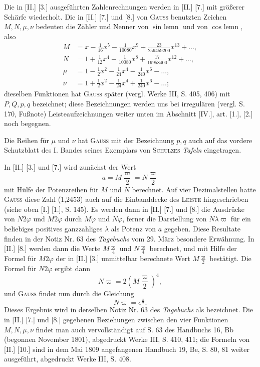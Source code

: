 Die in [II.] [3.] ausgeführten Zahlenrechnungen werden in [II.] [7.] mit größerer Schärfe wiederholt. Die in [II.] [7.] und [8.] von \textsc{Gauss} benutzten Zeichen \(M,N,\mu,\nu\) bedeuten die Zähler und Nenner von \(\sin\text{ lemn}\) und von \(\cos\text{ lemn}\), also
\[\begin{aligned}
M&=x-\frac1{16}x^5-\frac1{10080}x^9+\frac{23}{259459200}x^{13}+\ldots,\\
N&=1+\frac1{12}x^4-\frac1{10080}x^8+\frac{17}{19958400}x^{12}+\ldots,\\
\mu&=1-\frac12x^2-\frac1{24}x^4-\frac1{240}x^6-\ldots,\\
\nu&=1+\frac12x^2-\frac1{24}x^4+\frac1{240}x^6-\ldots;
\end{aligned}\]
dieselben Funktionen hat \textsc{Gauss} später (vergl. Werke III, S. 405, 406) mit \(P,Q,p,q\) bezeichnet; diese Bezeichnungen werden uns bei irregulären (vergl. S. 170, Fußnote) Leisteaufzeichnungen weiter unten im Abschnitt [IV.], art. [1.], [2.] noch begegnen.

Die Reihen für \(\mu\) und \(\nu\) hat \textsc{Gauss} mit der Bezeichnung \(p,q\) auch auf das vordere Schutzblatt des I. Bandes seines Exemplars von \textsc{Schulzes} \textit{Tafeln} eingetragen.

In [II.] [3.] und [7.] wird zunächst der Wert
\[a=M\frac{\varpi}{2}=N\frac{\varpi}{2}\]
mit Hülfe der Potenzreihen für \(M\) und \(N\) berechnet. Auf vier Dezimalstellen hatte \textsc{Gauss} diese Zahl (1,2453) auch auf die Einbanddecke des \textsc{Leiste} hingeschrieben (siehe oben [I.] [1.], S. 145). Es werden dann in [II.] [7.] und [8.] die Ausdrücke von \(N2\varphi\) und \(M2\varphi\) durch \(M\varphi\) und \(N\varphi\), ferner die Darstellung von \(N\lambda\varpi\) für ein beliebiges positives ganzzahliges \(\lambda\) als Potenz von \(a\) gegeben. Diese Resultate finden in der Notiz Nr. 63 des \textit{Tagebuchs} vom 29. März besondere Erwähnung. In [II.] [8.] werden dann die Werte \(M\frac{\varpi}{4}\) und \(N\frac{\varpi}{4}\) berechnet, und mit Hilfe der Formel für \(M2\varphi\) der in [II.] [3.] unmittelbar berechnete Wert \(M\frac{\varpi}{2}\) bestätigt. Die Formel für \(N2\varphi\) ergibt dann
\[N\varpi=2\left(M\frac{\varpi}{2}\right)^4,\]
und \textsc{Gauss} findet nun durch  die Gleichung
\[N\varpi=e^{\frac{\pi}{2}}.\]
Dieses Ergebnis wird in derselben Notiz Nr. 63 des \textit{Tagebuchs} als  bezeichnet.
\clearpage
{}
Die in [II.] [7.] und [8.] gegebenen Beziehungen zwischen den vier Funktionen \(M,N,\mu,\nu\) findet man auch vervollständigt auf S. 63 des Handbuchs 16, Bb (begonnen November 1801), abgedruckt Werke III, S. 410, 411; die Formeln von [II.] [10.] sind in dem Mai 1809 angefangenen Handbuch 19, Be, S. 80, 81 weiter ausgeführt, abgedruckt Werke III, S. 408.

